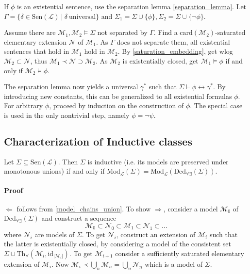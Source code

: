 \documentclass{scrartcl}
\begin{document}
If $\phi$ is an existential sentence, use the separation lemma \ref{separation_lemma}.
Let $\Gamma = \{ \delta \in \mathrm{Sen}(\mathcal{L}) \ | \ \delta \ \text{universal} \}$ and $\Sigma_1 = \Sigma \cup \{ \phi \}, \Sigma_2 = \Sigma \cup \{ \neg \phi \}$.

Assume there are $\mathcal{M}_1, \mathcal{M}_2 \models \Sigma$ not separated by $\Gamma$.
Find a $\mathrm{card}(\mathcal{M}_2)$-saturated elementary extension $\mathcal{N}$ of $\mathcal{M}_1$.
As $\Gamma$ does not separate them, all existential sentences that hold in $\mathcal{M}_1$ hold in $\mathcal{M}_2$.
By \ref{saturation_embedding}, get wlog $\mathcal{M}_2 \subset \mathcal{N}$, thus $\mathcal{M}_1 \prec \mathcal{N} \supset \mathcal{M}_2$.
As $\mathcal{M}_2$ is existentially closed, get $\mathcal{M}_1 \models \phi$ if and only if $\mathcal{M}_2 \models \phi$.

The separation lemma now yields a universal $\gamma^*$ such that $\Sigma \vdash \phi \leftrightarrow \gamma^*$.
By introducing new constants, this can be generalized to all existential formulas $\phi$.
For arbitrary $\phi$, proceed by induction on the construction of $\phi$. The special case is used in the only nontrivial step, namely $\phi = \neg \psi$.

\subsection{Characterization of Inductive classes}
Let $\Sigma \subseteq \mathrm{Sen}(\mathcal{L})$. 
Then $\Sigma$ is inductive (i.e. its models are preserved under monotonous unions) if and only if $\mathrm{Mod}_{\mathcal{L}}(\Sigma) = \mathrm{Mod}_{\mathcal{L}}(\mathrm{Ded}_{\forall\exists}(\Sigma))$.
\paragraph{Proof} $\Leftarrow$ follows from \ref{model_chains_union}. To show $\Rightarrow$, consider a model $\mathcal{M}_0$ of $\mathrm{Ded}_{\forall\exists}(\Sigma)$ and construct a sequence
\begin{equation*}
    \mathcal{M}_0 \subset \mathcal{N}_0 \subset \mathcal{M}_1 \subset \mathcal{N}_1 \subset ...
\end{equation*}
where $\mathcal{N}_i$ are models of $\Sigma$. 
To get $\mathcal{N}_i$, construct an extension of $\mathcal{M}_i$ such that the latter is existentially closed, by considering a model of the consistent set $\Sigma \cup \mathrm{Th}_\forall(\mathcal{M}_i, \mathrm{id}_{|\mathcal{M}_i|})$.
To get $\mathcal{M}_{i + 1}$ consider a sufficiently saturated elementary extension of $\mathcal{M}_i$.
Now $\mathcal{M}_i \prec \bigcup_n \mathcal{M}_n = \bigcup_n \mathcal{N}_n$ which is a model of $\Sigma$.
\end{document}
